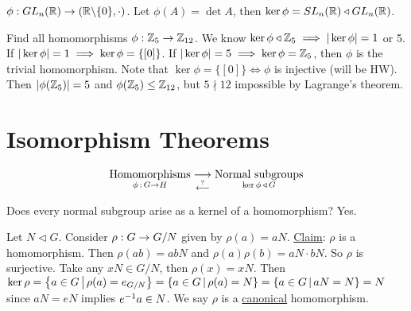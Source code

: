 \documentclass[]{article}
\begin{document}
\begin{example}
	$\phi:GL_n(\mathbb{R})\rightarrow(\mathbb{R}\backslash\{0\},\cdot)$.
	Let $\phi(A) = \det A$, then $\ker\phi = SL_n(\mathbb{R}) \triangleleft GL_n(\mathbb{R})$.
\end{example}
\begin{example}
	Find all homomorphisms $\phi:\mathbb{Z}_5\rightarrow\mathbb{Z}_{12}$.
	We know $\ker\phi\triangleleft\mathbb{Z}_5\implies |\ker\phi| = 1$ or 5.
	If $|\ker\phi| = 1 \implies \ker\phi = \left\{ [0] \right\}$. If $|\ker\phi| = 5\implies \ker\phi = \mathbb{Z}_5$, then $\phi$ is the trivial homomorphism.
	Note that $\ker\phi = \{[0]\}\iff\phi$ is injective (will be HW). Then $|\phi(\mathbb{Z}_5)| = 5$ and $\phi(\mathbb{Z}_5)\leq\mathbb{Z}_{12}$, but $5\nmid 12$ impossible by Lagrange's theorem.
\end{example}

\section{Isomorphism Theorems}

$$\underset{\phi\, :\, G\rightarrow H}{\text{Homomorphisms}} \underset{\overset{?}{\longleftarrow}}{\longrightarrow} \underset{\ker\phi\, \triangleleft\, G}{\text{Normal subgroups}}$$

Does every normal subgroup arise as a kernel of a homomorphism? Yes.

Let $N\triangleleft G$. Consider $\rho:G\rightarrow G/N$ given by $\rho(a) = aN$.
\ul{Claim}: $\rho$ is a homomorphism.
Then $\rho(ab) = abN$ and $\rho(a)\rho(b) = aN\cdot bN$.
So $\rho$ is surjective. Take any $xN\in G/N$, then $\rho(x) = xN$.
Then $\ker\rho = \left\{ a\in G \, \middle| \, \rho(a)=e_{G/N} \right\} = \left\{ a\in G \, \middle| \, \rho(a)=N \right\} = \left\{ a\in G \, \middle| \, aN=N \right\} = N$ since $aN=eN$ implies $e^{-1} a\in N$.
We say $\rho$ is a \ul{canonical} homomorphism.
\end{document}
